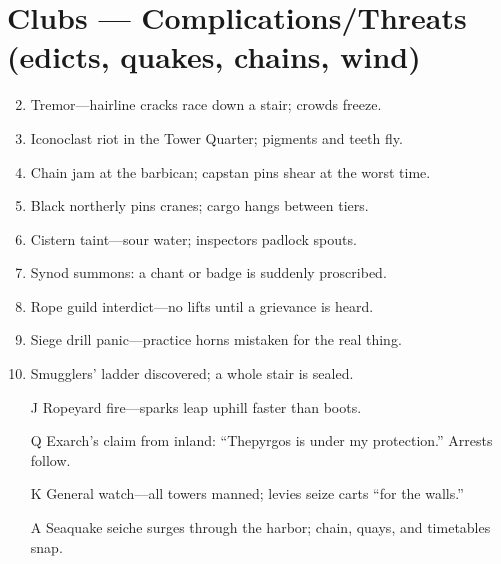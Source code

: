 \section*{Clubs --- Complications/Threats (edicts, quakes, chains, wind)}
\label{sec:thepyrgos-complications}
\begin{enumerate}
\setcounter{enumi}{1}
\item Tremor---hairline cracks race down a stair; crowds freeze.
\item Iconoclast riot in the Tower Quarter; pigments and teeth fly.
\item Chain jam at the barbican; capstan pins shear at the worst time.
\item Black northerly pins cranes; cargo hangs between tiers.
\item Cistern taint---sour water; inspectors padlock spouts.
\item Synod summons: a chant or badge is suddenly proscribed.
\item Rope guild interdict---no lifts until a grievance is heard.
\item Siege drill panic---practice horns mistaken for the real thing.
\item Smugglers' ladder discovered; a whole stair is sealed.
\item[J] Ropeyard fire---sparks leap uphill faster than boots.
\item[Q] Exarch's claim from inland: ``Thepyrgos is under my protection.'' Arrests follow.
\item[K] General watch---all towers manned; levies seize carts ``for the walls.''
\item[A] Seaquake seiche surges through the harbor; chain, quays, and timetables snap.
\end{enumerate}

